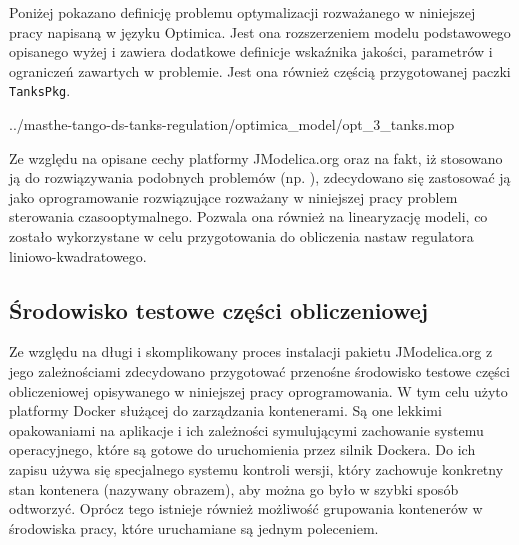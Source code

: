 Poniżej pokazano definicję problemu optymalizacji rozważanego w niniejszej pracy napisaną w języku Optimica.
Jest ona rozszerzeniem modelu podstawowego opisanego wyżej i zawiera dodatkowe definicje wskaźnika jakości, parametrów i ograniczeń zawartych w problemie. Jest ona również częścią przygotowanej paczki \texttt{TanksPkg}.


{../masthe-tango-ds-tanks-regulation/optimica_model/opt_3_tanks.mop}

Ze względu na opisane cechy platformy JModelica.org oraz na fakt, iż stosowano ją do rozwiązywania podobnych problemów (np. \cite{Hast09}), zdecydowano się zastosować ją jako oprogramowanie rozwiązujące rozważany w niniejszej pracy problem sterowania czasooptymalnego. Pozwala ona również na linearyzację modeli, co zostało wykorzystane w celu przygotowania do obliczenia nastaw regulatora liniowo-kwadratowego.

\subsection{Środowisko testowe części obliczeniowej}
\label{sub:czesc-wyzsza-docker}

Ze względu na długi i skomplikowany proces instalacji pakietu JModelica.org z jego zależnościami zdecydowano przygotować przenośne środowisko testowe części obliczeniowej opisywanego w niniejszej pracy oprogramowania. W tym celu użyto platformy Docker służącej do zarządzania kontenerami. Są one lekkimi opakowaniami na aplikacje i ich zależności symulującymi zachowanie systemu operacyjnego, które są gotowe do uruchomienia przez silnik Dockera. Do ich zapisu używa się specjalnego systemu kontroli wersji, który zachowuje konkretny stan kontenera (nazywany obrazem), aby można go było w szybki sposób odtworzyć.
Oprócz tego istnieje również możliwość grupowania kontenerów w środowiska pracy, które uruchamiane są jednym poleceniem.

